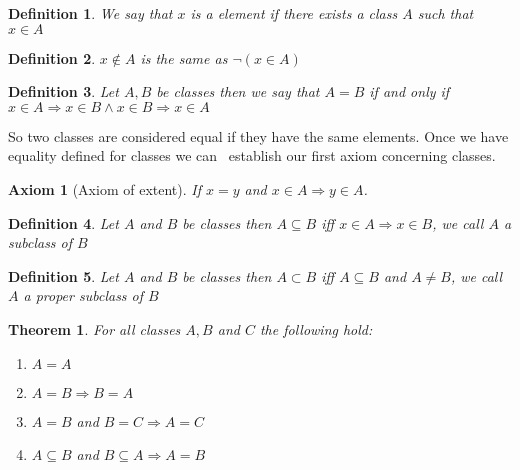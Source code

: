 \documentclass{book}
\newcommand{\nin}{\not\in}
\newtheorem{axiom}{Axiom}
\newtheorem{definition}{Definition}
{\theorembodyfont{\rmfamily}\newtheorem{example}{Example}}
\newtheorem{theorem}{Theorem}
\begin{document}
{{\begin{definition}
  {\index{$\in$}}We say that $x$ is a element if there exists a class $A$ such
  that $x \in A$
\end{definition}

\begin{definition}
  {\index{$\nin$}}$x \nin A$ is the same as $\neg (x \in A)$
\end{definition}

\begin{definition}
  \label{equality of classes}{}Let $A, B$ be classes then we
  say that $A = B$ if and only if $x \in A \Rightarrow x \in B \wedge x \in B
  \Rightarrow x \in A$
\end{definition}

So two classes are considered equal if they have the same elements. Once we
have equality defined for classes we can \ establish our first axiom
concerning classes.

\begin{axiom}[Axiom of extent]
  \label{axiom of extent}{}If $x = y$ and $x \in A
  \Rightarrow y \in A$. 
\end{axiom}

\begin{definition}
  \label{subclasses}{\index{$\subseteq$}}Let $A$ and $B$ be classes then $A
  \subseteq B$ iff $x \in A \Rightarrow x \in B$, we call $A$ a subclass of
  $B$
\end{definition}

\begin{definition}
  \label{proper subclass}{\index{$\subset$}}Let $A$ and $B$ be classes then $A
  \subset B$ iff $A \subseteq B$ and $A \neq B$, we call $A$ a proper subclass
  of $B$
\end{definition}

\begin{theorem}
  \label{properties of classes}For all classes $A, B$ and $C$ the following
  hold:
  \begin{enumerate}
    \item $A = A$
    
    \item $A = B \Rightarrow B = A$
    
    \item $A = B$ and $B = C \Rightarrow A = C$
    
    \item $A \subseteq B$ and $B \subseteq A \Rightarrow A = B$
    

\end{enumerate}
\end{theorem}}}
\end{document}
